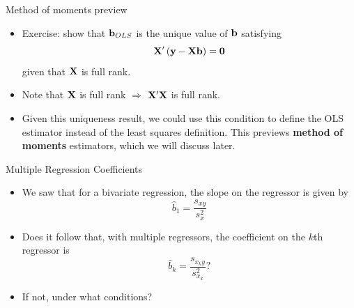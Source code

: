 \documentclass[aspectratio=169,11pt]{beamer}
\begin{document}
\begin{frame}{Method of moments preview}
\begin{itemize}
	\item Exercise: show that ${\bf b}_{OLS}$ is the unique value of ${\bf b}$ satisfying 
	\[
		{\bf X}' \left({\bf y} - {\bf X} {\bf b}  \right) ={\bf 0}
	\]
	given that ${\bf X}$ is full rank.

	\medskip
	\item Note that ${\bf X}$ is full rank $\Rightarrow$ ${\bf X}'{\bf X}$ is full rank.

	\medskip 
	\item Given this uniqueness result, we could use this condition to define the OLS estimator 
	instead of the least squares definition. 
	This previews {\bf method of moments} estimators, which we will discuss later.
	
\end{itemize}
\end{frame}





\begin{frame}{Multiple Regression Coefficients}
	\begin{itemize}
\item We saw that for a bivariate regression, the slope on the regressor is given by
\[
\hat{b}_1 =\frac{s_{xy}}{s_{x}^{2}} 
\]

\medskip
\item Does it follow that, with multiple regressors, the coefficient on the $k$th regressor is
\[
\hat{b}_k =\frac{s_{x_{k}y}}{s_{x_{k}}^{2}} ?
\]

\medskip
\item If not, under what conditions?

\end{itemize}
\end{frame}
\end{document}
